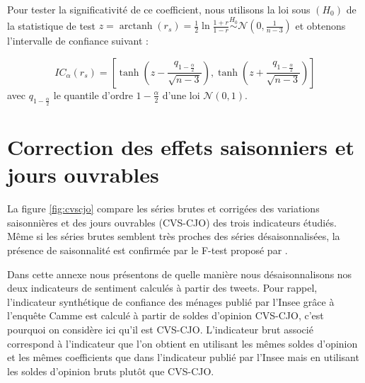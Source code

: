 \documentclass[11pt,french,french]{article}
\DeclareMathOperator{\arctanh}{arctanh}
\begin{document}
Pour tester la significativité de ce coefficient, nous utilisons la loi sous \((H_0)\) de la statistique de test \(z = \arctanh(r_s) = \frac{1}{2} \ln\frac{1+r}{1-r} \overset{H_0}{\sim}\mathcal{N}(0, \frac{1}{n-3})\) et obtenons l'intervalle de confiance suivant :

\[
IC_\alpha (r_s) = \left[\tanh\left(z-\frac{q_{1-\frac{\alpha}{2}}}{\sqrt{n-3}}\right),
\tanh\left(z+\frac{q_{1-\frac{\alpha}{2}}}{\sqrt{n-3}}\right)\right]
\]
avec \(q_{1-\frac{\alpha}{2}}\) le quantile d'ordre \(1-\frac{\alpha}{2}\) d'une loi \(\mathcal{N}(0, 1)\).

\newpage

\hypertarget{annexe:cvscjo}{%
\section{Correction des effets saisonniers et jours ouvrables}\label{annexe:cvscjo}}

La figure \ref{fig:cvscjo} compare les séries brutes et corrigées des variations saisonnières et des jours ouvrables (CVS-CJO) des trois indicateurs étudiés.
Même si les séries brutes semblent très proches des séries désaisonnalisées, la présence de saisonnalité est confirmée par le F-test proposé par \cite{lytras}.

Dans cette annexe nous présentons de quelle manière nous désaisonnalisons nos deux indicateurs de sentiment calculés à partir des tweets.
Pour rappel, l'indicateur synthétique de confiance des ménages publié par l'Insee grâce à l'enquête Camme est calculé à partir de soldes d'opinion CVS-CJO, c'est pourquoi on considère ici qu'il est CVS-CJO.
L'indicateur brut associé correspond à l'indicateur que l'on obtient en utilisant les mêmes soldes d'opinion et les mêmes coefficients que dans l'indicateur publié par l'Insee mais en utilisant les soldes d'opinion bruts plutôt que CVS-CJO.
\end{document}
